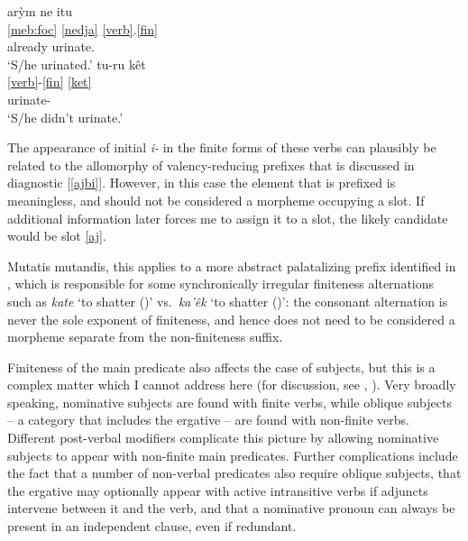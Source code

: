 \documentclass[output=paper]{langscibook}
\begin{document}
\ea\ea\glll arỳm ne itu\\
      \ref{meb:foc} \ref{nedja} \ref{verb}.\ref{fin}\\
      already \Nfut{} urinate.\Fin{}\\
    \glt `S/he urinated.'
  \ex\glll tu-ru kêt\\
      \ref{verb}-\ref{fin} \ref{ket}\\
      urinate-\Nfin{} \Neg\\
    \glt `S/he didn't urinate.'
  \z
\z

The appearance of initial {\em i-} in the finite forms of these verbs can plausibly be related to the allomorphy of valency-reducing prefixes that is discussed in diagnostic [\ref{ajbi}]. However, in this case the element that is prefixed is meaningless, and should not be considered a morpheme occupying a slot. If additional information later forces me to assign it to a slot, the likely candidate would be slot \ref{aj}.%

Mutatis mutandis, this applies to a more abstract palatalizing prefix identified in \citet{nikulin-salanova:ijal}, which is responsible for some synchronically irregular finiteness alternations such as {\em kate} `to shatter (\Fin{})' vs.\ {\em ka'êk} `to shatter (\Nfin{})': the consonant alternation is never the sole exponent of finiteness, and hence does not need to be considered a morpheme separate from the non-finiteness suffix.%



Finiteness of the main predicate also affects the case of subjects, but this is a complex matter which I cannot address here (for discussion, see \citealt{salanova:amerindia}, \citeyear{salanova:ergativity}). Very broadly speaking, nominative subjects are found with finite verbs, while oblique subjects -- a category that includes the ergative -- are found with non-finite verbs. Different post-verbal modifiers complicate this picture by allowing nominative subjects to appear with non-finite main predicates. Further complications include the fact that a number of non-verbal predicates also require oblique subjects, that the ergative may optionally appear with active intransitive verbs if adjuncts intervene between it and the verb, and that a nominative pronoun can always be present in an independent clause, even if redundant.
\end{document}
